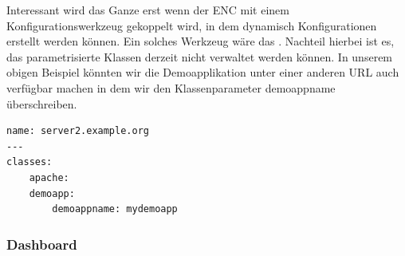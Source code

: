\documentclass[12pt,a4paper,ngerman]{article}
\begin{document}
Interessant wird das Ganze erst wenn der ENC mit einem Konfigurationswerkzeug gekoppelt wird, in dem dynamisch Konfigurationen erstellt werden können. Ein solches Werkzeug wäre das \cite{puppetdashboard}. Nachteil hierbei ist es, das parametrisierte Klassen derzeit nicht verwaltet werden können. In unserem obigen Beispiel könnten wir die Demoapplikation unter einer anderen URL auch verfügbar machen in dem wir den Klassenparameter demoappname überschreiben.


\begin{lstlisting}[caption=ENC's YAML mit Klassenparameter , label=puppet-enc-yaml-param]
name: server2.example.org
---
classes: 
    apache:
    demoapp: 
        demoappname: mydemoapp
\end{lstlisting} 

\subsubsection{Dashboard}
\end{document}
